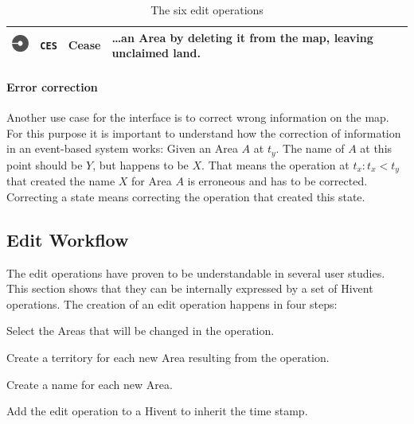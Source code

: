 \begin{table}[H]
\begin{center}
\begin{tabular}{m{0.75cm} m{0.8cm} m{2.4cm} m{9.1cm}}
  \midrule
  \vspace{0.35em}
  \raisebox{-0.35\height}
  {\includegraphics[width=0.72cm]{graphics/development/editing_hivent_data/edit_operations/CES}} &
  \texttt{CES} & Cease &
  \dots an Area by deleting it from the map, leaving unclaimed land. \\

  \bottomrule
\end{tabular}
\caption{The six edit operations}
\label{tab:edit_operations}
\end{center}
\end{table}

\paragraph{Error correction} %
\label{par:error_correction}

Another use case for the interface is to correct wrong information on the map. For this purpose it is important to understand how the correction of information in an event-based system works: Given an Area $A$ at $t_y$. The name of $A$ at this point should be $Y$, but happens to be $X$. That means the operation at $t_x: t_x < t_y$ that created the name $X$ for Area $A$ is erroneous and has to be corrected. Correcting a state means correcting the operation that created this state.



\subsection{Edit Workflow} %
\label{sub:edit_workflow}

The edit operations have proven to be understandable in several user studies. This section shows that they can be internally expressed by a set of Hivent operations. The creation of an edit operation happens in four steps:

\begin{compactenum}
  \item Select the Areas that will be changed in the operation.
  \item Create a territory for each new Area resulting from the operation.
  \item Create a name for each new Area.
  \item Add the edit operation to a Hivent to inherit the time stamp.
\end{compactenum}

